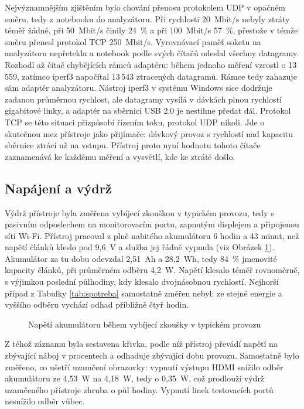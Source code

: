 Nejvýznamnějším zjištěním bylo chování přenosu protokolem UDP v opačném směru, tedy z notebooku do analyzátoru. Při rychlosti 20~Mbit/s nebyly ztráty téměř žádné, při 50~Mbit/s činily 24~\% a při 100~Mbit/s 57~\%, přestože v témže směru přenesl protokol TCP 250~Mbit/s. Vyrovnávací paměť soketu na analyzátoru nepřetekla a notebook podle svých čítačů odeslal všechny datagramy. Rozhodl až čítač chybějících rámců adaptéru: během jednoho měření vzrostl o 13\,559, zatímco iperf3 napočítal 13\,543 ztracených datagramů. Rámce tedy zahazuje sám adaptér analyzátoru. Nástroj iperf3 v systému Windows sice dodržuje zadanou průměrnou rychlost, ale datagramy vysílá v dávkách plnou rychlostí gigabitové linky, a adaptér na sběrnici USB 2.0 je nestihne předat dál. Protokol TCP se této situaci přizpůsobí řízením toku, protokol UDP nikoli. Jde o skutečnou mez přístroje jako přijímače: dávkový provoz s rychlostí nad kapacitu sběrnice ztrácí už na vstupu. Přístroj proto nyní hodnotu tohoto čítače zaznamenává ke každému měření a vysvětlí, kde ke ztrátě došlo.

\subsection{Napájení a výdrž}
\label{sec:overeni_napajeni}

Výdrž přístroje byla změřena vybíjecí zkouškou v typickém provozu, tedy s pasivním odposlechem na monitorovacím portu, zapnutým displejem a připojenou sítí Wi-Fi. Přístroj pracoval z plně nabitého akumulátoru 6 hodin a 43 minut, než napětí článků kleslo pod 9,6~V a služba jej řádně vypnula (viz Obrázek \ref{fig:graf_vybijeni}). Akumulátor za tu dobu odevzdal 2,51~Ah a 28,2~Wh, tedy 84~\% jmenovité kapacity článků, při průměrném odběru 4,2~W. Napětí klesalo téměř rovnoměrně, s výjimkou poslední půlhodiny, kdy klesalo dvojnásobnou rychlostí. Nejhorší případ z Tabulky \ref{tab:spotreba} samostatně změřen nebyl; ze stejné energie a vyššího odběru vychází odhad přibližně čtyř hodin.

\begin{figure}[htbp]
    \centering
    
    \caption{Napětí akumulátoru během vybíjecí zkoušky v typickém provozu}
    \label{fig:graf_vybijeni}
\end{figure}

Z téhož záznamu byla sestavena křivka, podle níž přístroj převádí napětí na zbývající náboj v procentech a odhaduje zbývající dobu provozu. Samostatně bylo změřeno, co ušetří uzamčení obrazovky: vypnutí výstupu HDMI snížilo odběr akumulátoru ze 4,53~W na 4,18~W, tedy o 0,35~W, což prodlouží výdrž uzamčeného přístroje zhruba o půl hodiny. Vypnutí linek testovacích portů nesnížilo odběr vůbec.

